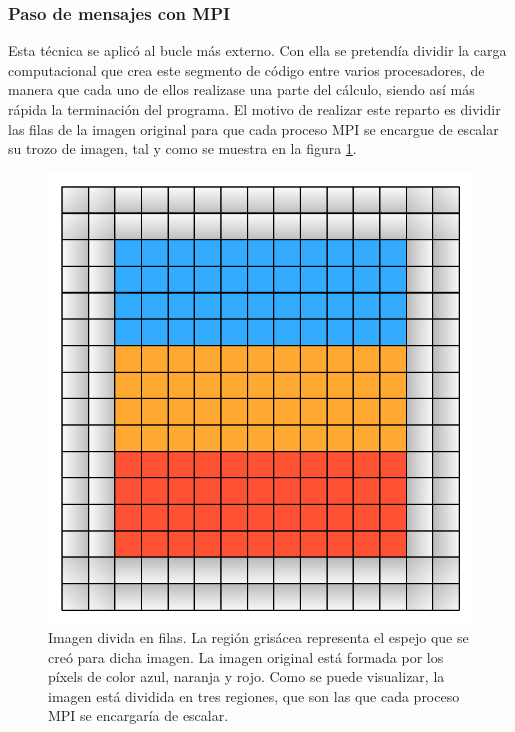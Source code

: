 \documentclass{article}
\begin{document}
\subsubsection{Paso de mensajes con MPI}
Esta técnica se aplicó al bucle más externo. Con ella se pretendía dividir la carga computacional que crea este segmento de código entre varios procesadores, de manera que cada uno de ellos realizase una parte del cálculo, siendo así más rápida la terminación del programa. El motivo de realizar este reparto es dividir las filas de la imagen original para que cada proceso MPI se encargue de escalar su trozo de imagen, tal y como se muestra en la figura \ref{fig:repartoFilas}\cite{MPICH2, OpenMPI}.

\begin{figure}[h]
        \centering
        \includegraphics[angle=0, height=0.3\textheight]{img/repartoFilas.pdf}
        \caption{Imagen divida en filas. La región grisácea representa el espejo que se creó para dicha imagen. La imagen original está formada por los píxels de color azul, naranja y rojo. Como se puede visualizar, la imagen está dividida en tres regiones, que son las que cada proceso MPI se encargaría de escalar.}
        \label{fig:repartoFilas}
\end{figure}
\end{document}
